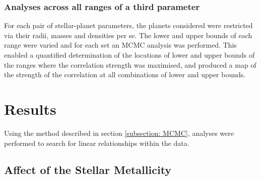 \documentclass[a4paper,twocolumn,12pt]{article}
\begin{document}
\subsubsection{Analyses across all ranges of a third parameter}
\label{subsection: Ranges}
For each pair of stellar-planet parameters, the planets considered were restricted via their radii, masses and densities per se. The lower and upper bounds of each range were varied and for each set an MCMC analysis was performed. This enabled a quantified determination of the locations of lower and upper bounds of the ranges where the correlation strength was maximised, and produced a map of the strength of the correlation at all combinations of lower and upper bounds.%


\section{Results}

Using the method described in section \ref{subsection: MCMC}, analyses were performed to search for linear relationships within the data.


\subsection{Affect of the Stellar Metallicity}

\end{document}
